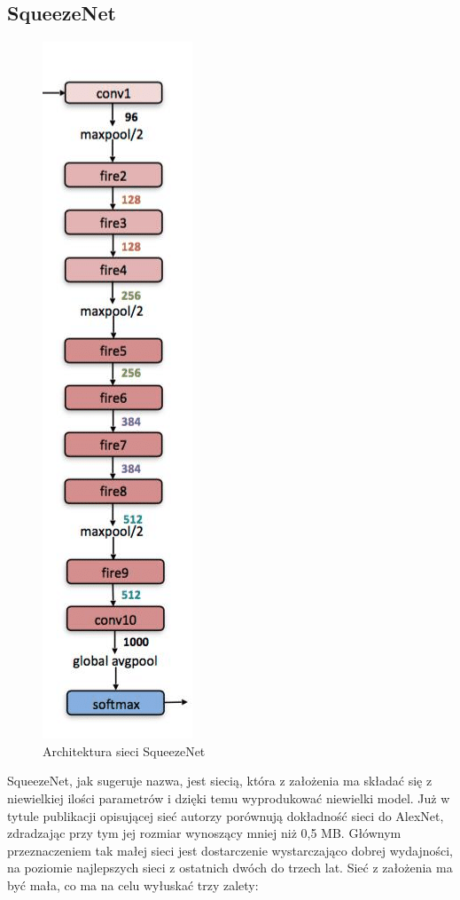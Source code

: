 \documentclass[12pt,a4paper,twoside,titlepage,openright]{book}
\begin{document}
\begin{itemize}
\section{SqueezeNet}
\begin{figure}[ht]
	\centering
			\includegraphics[resolution=100, scale=0.65]{SqueezeNet.png}
		\caption{Architektura sieci SqueezeNet}
\end{figure}
SqueezeNet, jak sugeruje nazwa, jest siecią, która z założenia ma składać się z niewielkiej ilości parametrów i dzięki temu wyprodukować niewielki model. Już w tytule publikacji opisującej sieć autorzy porównują dokładność sieci do AlexNet, zdradzając przy tym jej rozmiar wynoszący mniej niż 0,5 MB. Głównym przeznaczeniem tak małej sieci jest dostarczenie wystarczająco dobrej wydajności, na poziomie najlepszych sieci z ostatnich dwóch do trzech lat. Sieć z założenia ma być mała, co ma na celu wyłuskać trzy zalety:

\end{itemize}
\end{document}
